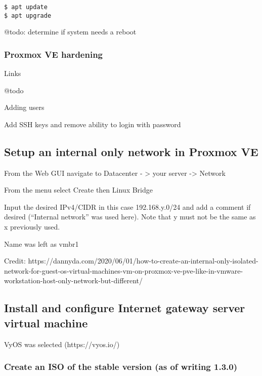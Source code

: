 \begin{verbatim}
$ apt update
$ apt upgrade
\end{verbatim}

@todo: determine if system needs a reboot

\hypertarget{proxmox-ve-hardening}{%
\subsubsection{Proxmox VE hardening}\label{proxmox-ve-hardening}}

Links

@todo

Adding users

Add SSH keys and remove ability to login with password

\hypertarget{setup-an-internal-only-network-in-proxmox-ve}{%
\subsection{Setup an internal only network in Proxmox
VE}\label{setup-an-internal-only-network-in-proxmox-ve}}

From the Web GUI navigate to Datacenter - \textgreater{} your server
-\textgreater{} Network

From the menu select Create then Linux Bridge

Input the desired IPv4/CIDR in this case 192.168.y.0/24 and add a
comment if desired (``Internal network'' was used here). Note that y
must not be the same as x previously used.

Name was left as vmbr1

Credit:
https://dannyda.com/2020/06/01/how-to-create-an-internal-only-isolated-network-for-guest-os-virtual-machines-vm-on-proxmox-ve-pve-like-in-vmware-workstation-host-only-network-but-different/

\hypertarget{install-and-configure-internet-gateway-server-virtual-machine}{%
\subsection{Install and configure Internet gateway server virtual
machine}\label{install-and-configure-internet-gateway-server-virtual-machine}}

VyOS was selected (https://vyos.io/)

\hypertarget{create-an-iso-of-the-stable-version-as-of-writing-1.3.0}{%
\subsubsection{Create an ISO of the stable version (as of writing
1.3.0)}\label{create-an-iso-of-the-stable-version-as-of-writing-1.3.0}}

